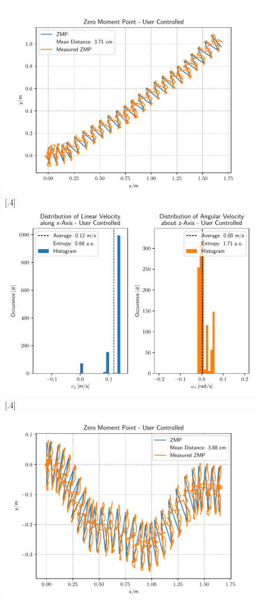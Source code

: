 \begin{figure}[h]
	[.4\linewidth]{\includegraphics[scale=.35]{chapters/05_experiments/01_user_controlled_walking/02_test_environment/curved_walk_01_zmp.pdf}}
	[.4\linewidth]{\includegraphics[scale=.35]{chapters/05_experiments/01_user_controlled_walking/02_test_environment/curved_walk_01_entropy.pdf}}
	[.4\linewidth]{\includegraphics[scale=.35]{chapters/05_experiments/01_user_controlled_walking/02_test_environment/obstacle_walk_02_zmp.pdf}}

\end{figure}
